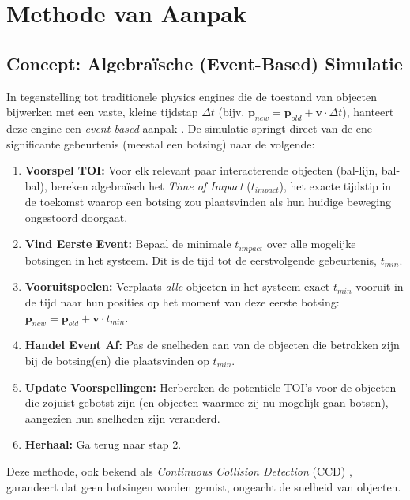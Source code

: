 \documentclass[11pt, a4paper]{article}
\newcommand{\vect}[1]{\mathbf{#1}}      %
\begin{document}
\section{Methode van Aanpak} \label{sec:methode}

\subsection{Concept: Algebraïsche (Event-Based) Simulatie}
In tegenstelling tot traditionele physics engines die de toestand van objecten bijwerken met een vaste, kleine tijdstap $\Delta t$ (bijv. $\vect{p}_{new} = \vect{p}_{old} + \vect{v} \cdot \Delta t$), hanteert deze engine een \textit{event-based} aanpak \parencite{PrincetonEventSim}. De simulatie springt direct van de ene significante gebeurtenis (meestal een botsing) naar de volgende:
\begin{enumerate}
    \item \textbf{Voorspel TOI:} Voor elk relevant paar interacterende objecten (bal-lijn, bal-bal), bereken algebraïsch het \textit{Time of Impact} ($t_{impact}$), het exacte tijdstip in de toekomst waarop een botsing zou plaatsvinden als hun huidige beweging ongestoord doorgaat.
    \item \textbf{Vind Eerste Event:} Bepaal de minimale $t_{impact}$ over alle mogelijke botsingen in het systeem. Dit is de tijd tot de eerstvolgende gebeurtenis, $t_{min}$.
    \item \textbf{Vooruitspoelen:} Verplaats \textit{alle} objecten in het systeem exact $t_{min}$ vooruit in de tijd naar hun posities op het moment van deze eerste botsing: $\vect{p}_{new} = \vect{p}_{old} + \vect{v} \cdot t_{min}$.
    \item \textbf{Handel Event Af:} Pas de snelheden aan van de objecten die betrokken zijn bij de botsing(en) die plaatsvinden op $t_{min}$.
    \item \textbf{Update Voorspellingen:} Herbereken de potentiële TOI's voor de objecten die zojuist gebotst zijn (en objecten waarmee zij nu mogelijk gaan botsen), aangezien hun snelheden zijn veranderd.
    \item \textbf{Herhaal:} Ga terug naar stap 2.
\end{enumerate}
Deze methode, ook bekend als \textit{Continuous Collision Detection} (CCD) \parencite{Box2DDocs, CattoCCD}, garandeert dat geen botsingen worden gemist, ongeacht de snelheid van objecten.
\end{document}
